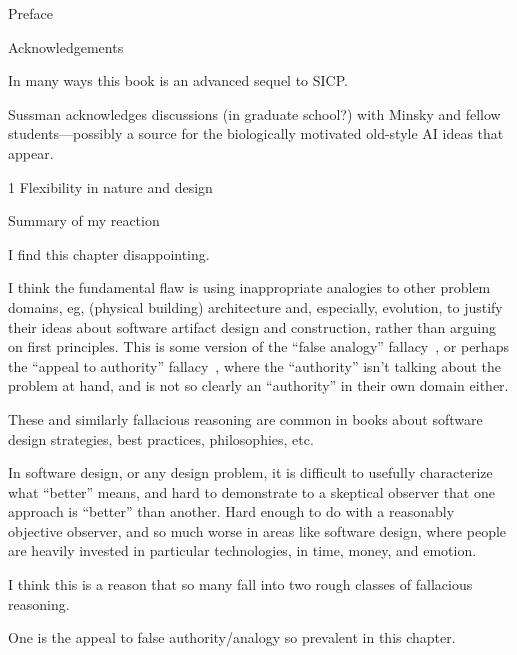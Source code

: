 \documentclass[11pt]{PalisadesLakesBook}
\begin{document}
\begin{plSection}{}
\begin{plSection}{Preface}
\end{plSection}%
\begin{plSection}{Acknowledgements}
\begin{plQuote}
{}{}
In many ways this book is an advanced sequel to SICP.
\end{plQuote}

Sussman acknowledges discussions (in graduate school?)
with Minsky and fellow students---possibly a source for the
biologically motivated old-style AI ideas that appear.
\end{plSection}%
\begin{plSection}{1 Flexibility in nature and design}
\begin{plSection}{Summary of my reaction}

I find this chapter disappointing.

I think the fundamental flaw is using 
inappropriate analogies to other problem domains,
eg, (physical building) architecture
and, especially, evolution, 
to justify their ideas about software artifact design
and construction,
rather than arguing on first principles.
This is some version of the ``false analogy'' 
fallacy~\cite{wiki:ArgumentFromAnalogyFalse},
or perhaps the
``appeal to authority'' fallacy~\cite{wiki:ArgumentFromAuthority},
where the ``authority'' isn't talking about the problem at hand, 
and is not so clearly an ``authority'' in their own domain either.

These and similarly fallacious reasoning are common
in books about software design strategies, best practices,
philosophies, etc.

In software design, or any design problem,
it is difficult to usefully characterize what ``better'' means,
and hard to demonstrate to a skeptical observer that one
approach is ``better'' than another.
Hard enough to do with a reasonably objective observer,
and so much worse in areas like software design,
where people are heavily invested in particular technologies,
in time, money, and emotion.

I think this is a reason that so many fall into two rough classes
of fallacious reasoning. 

One is the appeal to false authority/analogy so prevalent in this 
chapter. 


\end{plSection}
\end{plSection}
\end{plSection}
\end{document}
